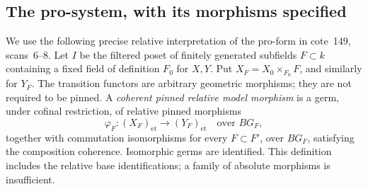 \subsection{The pro-system, with its morphisms specified}

We use the following precise relative interpretation of the
pro-form in cote~149, scans~6--8. Let \(I\) be the filtered poset
of finitely generated subfields \(F\subset k\) containing a fixed
field of definition \(F_0\) for \(X,Y\). Put
\(X_F=X_0\times_{F_0}F\), and similarly for \(Y_F\).
The transition functors are arbitrary geometric morphisms; they
are not required to be pinned. A \emph{coherent pinned relative
model morphism} is a germ, under cofinal restriction, of relative
pinned morphisms
\[
       \varphi_F:(X_F)_{\mathrm{et}}\longrightarrow
                         (Y_F)_{\mathrm{et}}
                  \quad\text{over }BG_F,
\]
together with commutation isomorphisms for every \(F\subset F'\),
over \(BG_F\), satisfying the composition coherence. Isomorphic
germs are identified. This definition includes the relative base
identifications; a family of absolute morphisms is insufficient.

